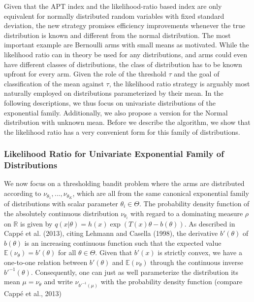 \documentclass[11pt,]{article}
\begin{document}
Given that the APT index and the likelihood-ratio based index are only
equivalent for normally distributed random variables with fixed standard
deviation, the new strategy promises efficiency improvements whenever
the true distribution is known and different from the normal
distribution. The most important example are Bernoulli arms with small
means as motivated. While the likelihood ratio can in theory be used for
any distributions, and arms could even have different classes of
distributions, the class of distribution has to be known upfront for
every arm. Given the role of the threshold \(\tau\) and the goal of
classification of the mean against \(\tau\), the likelihood ratio
strategy is arguably most naturally employed on distributions
parameterized by their mean. In the following descriptions, we thus
focus on univariate distributions of the exponential family.
Additionally, we also propose a version for the Normal distribution with
unknown mean. Before we describe the algorithm, we show that the
likelihood ratio has a very convenient form for this family of
distributions.

\subsubsection{\texorpdfstring{Likelihood Ratio for Univariate
Exponential Family of Distributions
\label{sec:LRforUnivariateExponentialFamily}}{Likelihood Ratio for Univariate Exponential Family of Distributions }}\label{likelihood-ratio-for-univariate-exponential-family-of-distributions}

We now focus on a thresholding bandit problem where the arms are
distributed according to \(\nu_{\theta_1}, ..., \nu_{\theta_K}\), which
are all from the same canonical exponential family of distributions with
scalar parameter \(\theta_i \in \Theta\). The probability density
function of the absolutely continuous distribution \(\nu_{\theta_i}\)
with regard to a dominating measure \(\rho\) on \(\mathbb{R}\) is given
by \(q(x|\theta) = h(x) \exp(T(x)\theta - b(\theta))\). As described in
Cappé et al. (2013), citing Lehmann and Casella (1998), the derivative
\(b'(\theta)\) of \(b(\theta)\) is an increasing continuous function
such that the expected value \(\mathbb{E}(\nu_{\theta}) = b'(\theta)\)
for all \(\theta \in \Theta\). Given that \(b'(x)\) is strictly convex,
we have a one-to-one relation between \(b'(\theta)\) and
\(\mathbb{E}(\nu_{\theta})\) through the continuous inverse
\(b'^{-1}(\theta)\). Consequently, one can just as well parameterize the
distribution its mean \(\mu = \mathbb{\nu_{\theta}}\) and write
\(\nu_{b'^{-1}(\mu)}\) with the probability density function (compare
Cappé et al., 2013)
\end{document}
